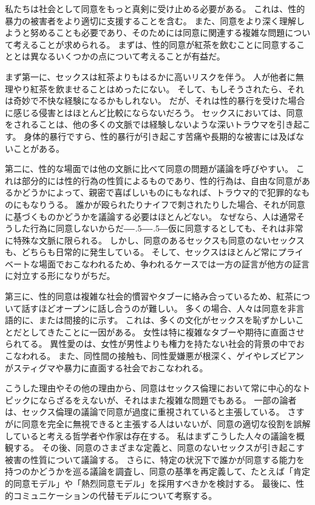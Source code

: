 \documentclass[paper=a4,book,openany]{jlreq}
\def\DDASH{―\kern-.5\zw―\kern-.5\zw―} %
\begin{document}
私たちは社会として同意をもっと真剣に受け止める必要がある。
これは、性的暴力の被害者をより適切に支援することを含む。
また、同意をより深く理解しようと努めることも必要であり、そのためには同意に関連する複雑な問題について考えることが求められる。
まずは、性的同意が紅茶を飲むことに同意することとは異なるいくつかの点について考えることが有益だ。

まず第一に、セックスは紅茶よりもはるかに高いリスクを伴う。
人が他者に無理やり紅茶を飲ませることはめったにない。
そして、もしそうされたら、それは奇妙で不快な経験になるかもしれない。
だが、それは性的暴行を受けた場合に感じる侵害とはほとんど比較にならないだろう。
セックスにおいては、同意をされることは、他の多くの文脈では経験しないような深いトラウマを引き起こす。
身体的暴行ですら、性的暴行が引き起こす苦痛や長期的な被害には及ばないことがある。

第二に、性的な場面では他の文脈に比べて同意の問題が議論を呼びやすい。
これは部分的には性的行為の性質によるものであり、性的行為は、自由な同意があるかどうかによって、親密で喜ばしいものにもなれば、トラウマ的で犯罪的なものにもなりうる。
誰かが殴られたりナイフで刺されたりした場合、それが同意に基づくものかどうかを議論する必要はほとんどない。
なぜなら、人は通常そうした行為に同意しないからだ{\DDASH}仮に同意するとしても、それは非常に特殊な文脈に限られる。
しかし、同意のあるセックスも同意のないセックスも、どちらも日常的に発生している。
そして、セックスはほとんど常にプライベートな場面でおこなわれるため、争われるケースでは一方の証言が他方の証言に対立する形になりがちだ。

第三に、性的同意は複雑な社会的慣習やタブーに絡み合っているため、紅茶について話すほどオープンに話し合うのが難しい。
多くの場合、人々は同意を非言語的に、または間接的に示す。
これは、多くの文化がセックスを恥ずかしいことだとしてきたことに一因がある。
女性は特に複雑なタブーや期待に直面させられてる。
異性愛のは、女性が男性よりも権力を持たない社会的背景の中でおこなわれる。
また、同性間の接触も、同性愛嫌悪が根深く、ゲイやレズビアンがスティグマや暴力に直面する社会でおこなわれる。

こうした理由やその他の理由から、同意はセックス倫理において常に中心的なトピックにならざるをえないが、それはまた複雑な問題でもある。
一部の論者は、セックス倫理の議論で同意が過度に重視されていると主張している。
さすがに同意を完全に無視できると主張する人はいないが、同意の適切な役割を誤解していると考える哲学者や作家は存在する。
私はまずこうした人々の議論を概観する。
その後、同意のさまざまな定義と、同意のないセックスが引き起こす被害の性質について議論する。
さらに、特定の状況下で誰かが同意する能力を持つのかどうかを巡る議論を調査し、同意の基準を再定義して、たとえば「肯定的同意モデル」や「熱烈同意モデル」を採用すべきかを検討する。
最後に、性的コミュニケーションの代替モデルについて考察する。
\end{document}

